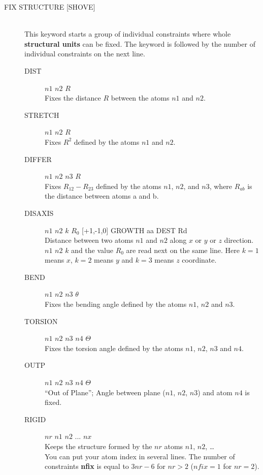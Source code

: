 \documentclass[twoside,10pt,titlepage,a4paper]{article}
\begin{document}
\begin{description}
        \item[FIX STRUCTURE {[SHOVE]} ] \hfill \\
          This keyword starts a group of individual constraints where
          whole {\bf structural units} can be fixed. The keyword is
          followed by the number of individual constraints on the next line.
          \begin{description}
          \item[DIST]  $n1$ $n2$ $R$ \hfill\\
            Fixes the distance $R$ between the atoms $n1$ and $n2$.
          \item[STRETCH]  $n1$ $n2$ $R$ \hfill\\
            Fixes $R^2$ defined by the atoms $n1$ and $n2$.
                          \item[DIFFER]  $n1$ $n2$ $n3$ $R$ \hfill\\
            Fixes $R_{12}-R_{23}$ defined by the atoms $n1$, $n2$, and $n3$,
            where $R_{ab}$ is the distance between atoms a and b.
          \item[DISAXIS] $n1$ $n2$ $k$ $R_0$  [+1,-1,0] GROWTH aa DEST Rd \hfill\\
            Distance between two atoms $n1$ and $n2$ along $x$ or $y$ or $z$ direction. 
            $n1$ $n2$ $k$ and the value $R_0$ are read next on the same line. 
            Here $k=1$ means $x$, $k=2$ means $y$ and $k=3$ means $z$ coordinate.
          \item[BEND]  $n1$ $n2$ $n3$ $\theta$ \hfill\\
            Fixes the bending angle defined by the atoms
            $n1$, $n2$ and $n3$.
          \item[TORSION]  $n1$ $n2$ $n3$ $n4$ $\Theta$ \hfill\\
            Fixes the torsion angle defined by the atoms
            $n1$, $n2$, $n3$ and $n4$.
          \item[OUTP]  $n1$ $n2$ $n3$ $n4$ $\Theta$ \hfill\\
            ``Out of Plane''; Angle between plane
            ($n1$, $n2$, $n3$) and atom $n4$ is fixed.

          \item[RIGID]  $nr$ $n1$ $n2$ ... $nx$  \hfill\\
            Keeps the structure formed by the $nr$ atoms
            $n1$, $n2$, \dots\\
            You can put your atom index in several lines.
            The number of constraints {\bf nfix} is equal to
            $3nr-6$ for $nr>2$ ($nfix=1$ for $nr=2$).


\end{description}
\end{description}
\end{document}
